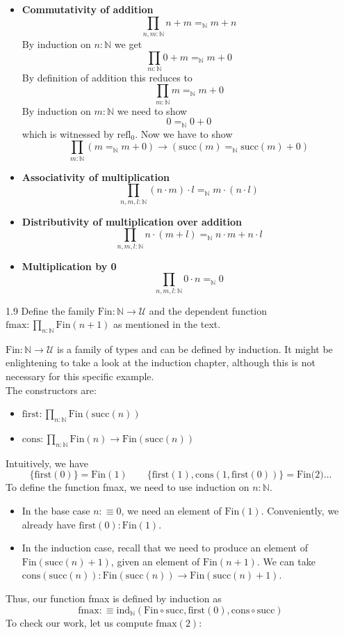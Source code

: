 \documentclass[14pt]{extarticle}
\newcommand{\N}{{\mathbb N}}
\newcommand{\0}{{\mathbf 0}}
\newcommand{\1}{{\mathbf 1}}
\newcommand{\2}{{\mathbf 2}}
\newcommand{\UU}{{\mathcal U}}
\newcommand{\su}{\mathrm{succ}}
\newcommand{\ind}{\mathrm{ind}}
\newcommand{\refl}{\mathrm{refl}}
\newcommand{\cons}{\mathrm{cons}}
\begin{document}
\begin{itemize}
\item \textbf{Commutativity of addition}
\[\prod_{n,m : \N}n+m =_\N m+n\]
By induction on $n:\N$ we get 
\[\prod_{m : \N}0+m =_\N m+0\]
By definition of addition this reduces to 
\[\prod_{m : \N}m =_\N m+0\]
By induction on $m:\N$ we need to show 
\[0 =_\N 0+0\] which is witnessed by $\refl_0$. Now we have to show
\[\prod_{m : \N}(m =_\N m+0) \to (\su(m) =_\N \su(m)+0)\]


\item \textbf{Associativity of multiplication}
\[\prod_{n,m,l : \N}(n \cdot m) \cdot l =_\N m\cdot(n \cdot l)\]
\item \textbf{Distributivity of multiplication over addition}
\[\prod_{n,m,l : \N}n \cdot (m +l) =_\N n \cdot m + n \cdot l\]
\item \textbf{Multiplication by 0}
\[\prod_{n,m,l : \N}0 \cdot n =_\N 0\]
\end{itemize}

\begin{prob}{1.9}{}
Define the family $\text{Fin} : \N \to \UU$ and the dependent function $\text{fmax} : \prod_{n:\N} \text{Fin}(n+1)$ as mentioned in the text.
\end{prob}
$\text{Fin} : \N \to \UU$ is a family of types and can be defined by induction. It might be enlightening to take a look at the induction chapter, although this is not necessary for this specific example.\\
The constructors are:
\begin{itemize}
\item $\text{first} : \prod_{n:\N}\text{Fin}(\su(n))$
\item $\cons : \prod_{n:\N}\text{Fin}(n) \to \text{Fin}(\su(n))$
\end{itemize}
Intuitively, we have
\[\{\text{first}(0)\} = \text{Fin}(1) \qquad \{\text{first}(1),\cons(1,\text{first}(0))\} = \text{Fin(2)}  \ldots\]
To define the function fmax, we need to use induction on $n:\N$.

\begin{itemize}
\item In the base case $n:\equiv 0$, we need an element of $\text{Fin}(1)$. Conveniently, we already have $\text{first}(0) : \text{Fin}(1)$.
\item In the induction case, recall that we need to produce an element of $\text{Fin}(\su(n) + 1)$, given an element of $\text{Fin}(n + 1)$. We can take $\cons(\su(n)) : \text{Fin}(\su(n)) \to \text{Fin}(\su(n) + 1)$.
\end{itemize}
Thus, our function fmax is defined by induction as
\[\text{fmax}: \equiv \ind_\N(\text{Fin} \circ \su,\text{first}(0),\cons \circ \su)\] To check our work, let us compute $\text{fmax}(2)$:
\end{document}

